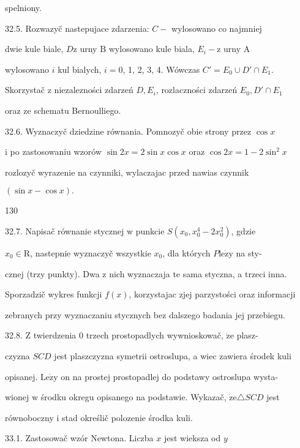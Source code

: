 \documentclass[a4paper,12pt]{article}
\begin{document}
spelniony.

32.5. Rozwazyč nastepujace zdarzenia: $C -$ wylosowano co najmniej

dwie kule biale, $D \mathrm{z}$ urny $\mathrm{B}$ wylosowano kule biala, $E_{i} - \mathrm{z}$ urny $\mathrm{A}$

wylosowano $i$ kul bialych, $i=0$, 1, 2, 3, 4. Wówczas $C'=E_{0}\cup D'\cap E_{1}.$

Skorzystač $\mathrm{z}$ niezalezności zdarzeń $D, E_{i}$, rozlaczności zdarzeń $E_{0}, D'\cap E_{1}$

oraz ze schematu Bernoulliego.

32.6. Wyznaczyč dziedzine równania. Pomnozyč obie strony przez $\cos x$

$\mathrm{i}$ po zastosowaniu wzorów $\sin 2x = 2\sin x\cos x$ oraz $\cos 2x = 1-2\sin^{2}x$

rozlozyč wyrazenie na czynniki, wylaczajac przed nawias czynnik

$(\sin x-\cos x).$





130

32.7. Napisač równanie stycznej $\mathrm{w}$ punkcie $S(x_{0},x_{0}^{4}-2x_{0}^{2})$, gdzie

$x_{0} \in \mathrm{R}$, nastepnie wyznaczyč wszystkie $x_{0}$, dla których $P \mathrm{l}\mathrm{e}\dot{\mathrm{z}}\mathrm{y}$ na sty-

cznej (trzy punkty). Dwa $\mathrm{z}$ nich wyznaczaja $\mathrm{t}\mathrm{e}$ sama styczna, a trzeci inna.

Sporzadzič wykres funkcji $f(x)$, korzystajac zjej parzystości oraz informacji

zebranych przy wyznaczaniu stycznych bez dalszego badania jej przebiegu.

32.8. $\mathrm{Z}$ twierdzenia $0$ trzech prostopadlych wywnioskowač, $\dot{\mathrm{z}}\mathrm{e}$ plasz-

czyzna $SCD$ jest plaszczyzna symetrii ostroslupa, a wiec zawiera środek kuli

opisanej. $\mathrm{L}\mathrm{e}\dot{\mathrm{z}}\mathrm{y}$ on na prostej prostopadlej do podstawy ostroslupa wysta-

wionej $\mathrm{w}$ środku okregu opisanego na podstawie. Wykazač, $\dot{\mathrm{z}}\mathrm{e}\triangle SCD$ jest

równoboczny $\mathrm{i}$ stad określič polozenie środka kuli.

33.1. Zastosowač wzór Newtona. Liczba $x$ jest wieksza od $y$
\end{document}

